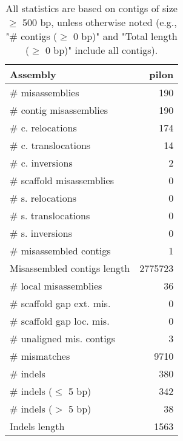 \documentclass[12pt,a4paper]{article}
\begin{document}
\begin{table}[ht]
\begin{center}
\caption{All statistics are based on contigs of size $\geq$ 500 bp, unless otherwise noted (e.g., "\# contigs ($\geq$ 0 bp)" and "Total length ($\geq$ 0 bp)" include all contigs).}
\begin{tabular}{|l*{1}{|r}|}
\hline
Assembly & pilon \\ \hline
\# misassemblies & 190 \\ \hline
\hspace{2mm}\# contig misassemblies & 190 \\ \hline
\hspace{5mm}\# c. relocations & 174 \\ \hline
\hspace{5mm}\# c. translocations & 14 \\ \hline
\hspace{5mm}\# c. inversions & 2 \\ \hline
\hspace{2mm}\# scaffold misassemblies & 0 \\ \hline
\hspace{5mm}\# s. relocations & 0 \\ \hline
\hspace{5mm}\# s. translocations & 0 \\ \hline
\hspace{5mm}\# s. inversions & 0 \\ \hline
\# misassembled contigs & 1 \\ \hline
Misassembled contigs length & 2775723 \\ \hline
\# local misassemblies & 36 \\ \hline
\# scaffold gap ext. mis. & 0 \\ \hline
\# scaffold gap loc. mis. & 0 \\ \hline
\# unaligned mis. contigs & 3 \\ \hline
\# mismatches & 9710 \\ \hline
\# indels & 380 \\ \hline
\hspace{5mm}\# indels ($\leq$ 5 bp) & 342 \\ \hline
\hspace{5mm}\# indels ($>$ 5 bp) & 38 \\ \hline
Indels length & 1563 \\ \hline
\end{tabular}
\end{center}
\end{table}
\end{document}
